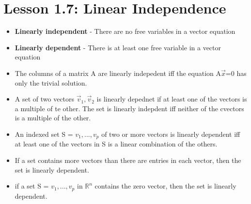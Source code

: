 \documentclass{report}
\newcommand{\Ax}{A$\vec{x}$}
\begin{document}
\section{Lesson 1.7: Linear Independence}
	\begin{itemize}\addtolength{\leftskip}{2em}
		\item \textbf{Linearly independent} - There are no free variables in a vector equation
		\item \textbf{Linearly dependent} - There is at least one free variable in a vector equation
		\item The columns of a matrix A are linearly indepedent iff the equation \Ax=0 has only the trivial solution.
		\item A set of two vectors {$\vec{v}_1,\vec{v}_2$} is linearly depednet if at least one of the vectors is a multiple of te other. The set is linearly indepdent iff neither of the cvectors is a multiple of the other.
		\item  An indexed set S = {$v_1,...,v_p$} of two or more vectors is linearly dependent iff at least one of the vectors in S is a linear combination of the others.
		\item If a set contains more vectors than there are entries in each vector, then the set is linearly dependent. 
		\item if a set S = ${v_1,...,v_p}$ in {$\mathbb{R}^n$} contains the zero vector, then the set is linearly dependent. 
	\end{itemize}
	
	\newpage
\end{document}
